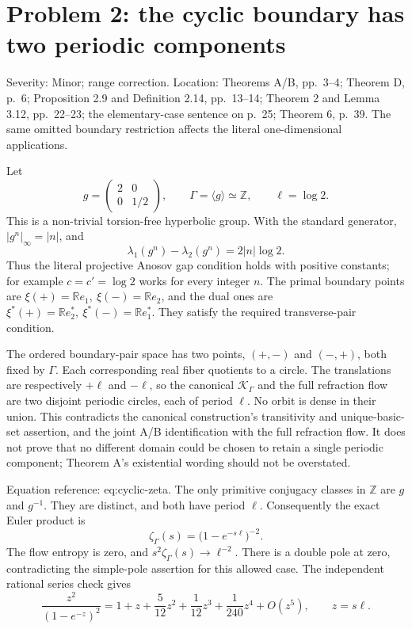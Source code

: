 \documentclass[10pt]{article}
\begin{document}
\section*{Problem 2: the cyclic boundary has two periodic components}
Severity: Minor; range correction. Location: Theorems A/B, pp. 3–4; Theorem D, p. 6; Proposition 2.9 and Definition 2.14, pp. 13–14; Theorem 2 and Lemma 3.12, pp. 22–23; the elementary-case sentence on p. 25; Theorem 6, p. 39. The same omitted boundary restriction affects the literal one-dimensional applications.\par
Let \[g=\begin{pmatrix}2&0\\0&1/2\end{pmatrix},\qquad
 \Gamma=\langle g\rangle\simeq\mathbb Z,\qquad \ell=\log2.\] This is a non-trivial torsion-free hyperbolic group. With the standard generator, \(|g^n|_\infty=|n|\), and \[\lambda_1(g^n)-\lambda_2(g^n)=2|n|\log2.\] Thus the literal projective Anosov gap condition holds with positive constants; for example \(c=c'=\log2\) works for every integer \(n\). The primal boundary points are \(\xi(+)=\mathbb Re_1,\ \xi(-)=\mathbb Re_2\), and the dual ones are \(\xi^*(+)=\mathbb Re_2^*,\ \xi^*(-)=\mathbb Re_1^*\). They satisfy the required transverse-pair condition.\par
The ordered boundary-pair space has two points, \((+,-)\) and \((-,+)\), both fixed by \(\Gamma\). Each corresponding real fiber quotients to a circle. The translations are respectively \(+\ell\) and \(-\ell\), so the canonical \(\mathcal K_\Gamma\) and the full refraction flow are two disjoint periodic circles, each of period \(\ell\). No orbit is dense in their union. This contradicts the canonical construction’s transitivity and unique-basic-set assertion, and the joint A/B identification with the full refraction flow. It does not prove that no different domain could be chosen to retain a single periodic component; Theorem A’s existential wording should not be overstated.\par
Equation reference: eq:cyclic-zeta. The only primitive conjugacy classes in \(\mathbb Z\) are \(g\) and \(g^{-1}\). They are distinct, and both have period \(\ell\). Consequently the exact Euler product is \[
 \zeta_\Gamma(s)=\bigl(1-e^{-s\ell}\bigr)^{-2}.\] The flow entropy is zero, and \(s^2\zeta_\Gamma(s)\to\ell^{-2}\). There is a double pole at zero, contradicting the simple-pole assertion for this allowed case. The independent rational series check gives \[\frac{z^2}{(1-e^{-z})^2}
 =1+z+\frac{5}{12}z^2+\frac1{12}z^3+\frac1{240}z^4+O(z^5),
 \qquad z=s\ell .\]\par
\end{document}
